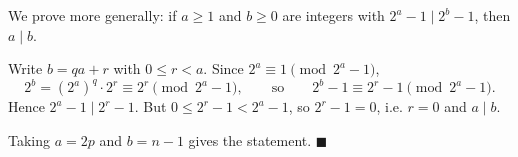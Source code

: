 We prove more generally: if $a\ge1$ and $b\ge0$ are integers with $2^a-1\mid2^b-1$, then $a\mid b$.

Write $b=qa+r$ with $0\le r<a$. Since $2^a\equiv1\pmod{2^a-1}$,
\[2^b=\left(2^a\right)^q\cdot2^r\equiv2^r\pmod{2^a-1},\qquad\text{so}\qquad 2^b-1\equiv2^r-1\pmod{2^a-1}.\]
Hence $2^a-1\mid2^r-1$. But $0\le2^r-1<2^a-1$, so $2^r-1=0$, i.e. $r=0$ and $a\mid b$.

Taking $a=2p$ and $b=n-1$ gives the statement. $\blacksquare$
